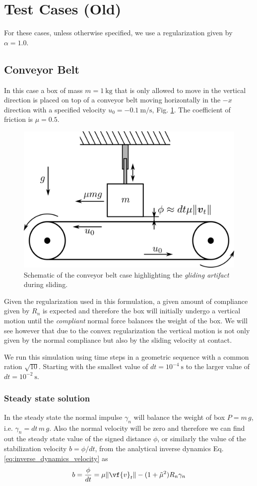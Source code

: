 
\section{Test Cases (Old)}
\label{sec:test_cases_old}

For these cases, unless otherwise specified, we use a regularization given by
$\alpha=1.0$. 

\subsection{Conveyor Belt}
\label{sec:conveyor_belt}

In this case a box of mass $m=1~\text{kg}$ that is only allowed to move in the
vertical direction is placed on top of a conveyor belt moving horizontally in
the $-x$ direction with a specified velocity $u_0=-0.1~\text{m}/\text{s}$, Fig.
\ref{fig:conveyor_belt}. The coefficient of friction is $\mu=0.5$.

\begin{figure}[!h]
	\centering
	\includegraphics[width=0.4\columnwidth]{figures/conveyor_belt/conveyor_belt.png}
	\caption{\label{fig:conveyor_belt} 
	Schematic of the conveyor belt case highlighting the \textit{gliding
	artifact} during sliding.}
\end{figure}

Given the regularization used in this formulation, a given amount of compliance
given by $R_n$ is expected and therefore the box will initially undergo a
vertical motion until the \textit{compliant} normal force balances the weight of
the box. We will see however that due to the convex regularization the vertical
motion is not only given by the normal compliance but also by the sliding
velocity at contact.

We run this simulation using time steps in a geometric sequence with a common
ration $\sqrt{10}$. Starting with the smallest value of $dt = 10^{-4}~\text{s}$
to the larger value of $dt = 10^{-2}~\text{s}$.

\subsubsection{Steady state solution}
In the steady state the normal impulse $\gamma_n$ will balance the weight of box
$P=m\,g$, i.e. $\gamma_n=dt\,m\,g$. Also the normal velocity will be zero and
therefore we can find out the steady state value of the signed distance $\phi$,
or similarly the value of the stabilization velocity $b=\phi/dt$, from the
analytical inverse dynamics Eq. \ref{eq:inverse_dynamics_velocity} as
\begin{eqnarray}
	b=\frac{\phi}{dt}=\mu\Vert\vf{v}_t\Vert-(1+\tilde\mu^2)R_n\gamma_n
\end{eqnarray}

